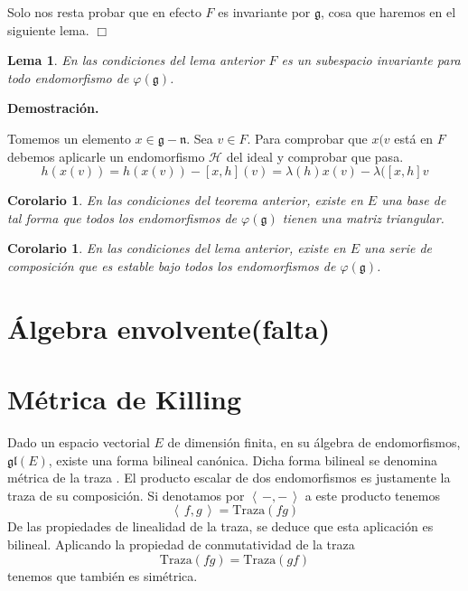 \documentclass[a4paper,draft,12pt]{scrartcl}
\newtheorem{lema}[teo]{Lema}%
\newtheorem{cor}[teo]{Corolario}%
\newcommand{\dem}{\noindent \textbf{Demostración. }\vspace{0.3 cm}}%
\newcommand{\g}{\mathfrak{g}}%
\newcommand{\h}{\mathcal{H}}%
\newcommand{\fin}{ $\Box $ \vspace{0.4 cm}}
\newcommand{\escalar}[2]{\left\langle\, #1,#2\, \right\rangle}  %
\newcommand{\df}[1]{\textsf{\color{blue}#1}}
\begin{document}
 Solo nos resta probar que en efecto $F$ es invariante por $\g$, cosa que haremos en el siguiente lema.  \fin
 
 \begin{lema}
 
En las condiciones del lema anterior $F$ es un subespacio invariante para todo endomorfismo de $\varphi (\g)$.

\end{lema}


\dem

Tomemos un elemento $x \in \g - \mathfrak{n}$.  Sea $v \in F$.  Para comprobar que $x(v$ está en $F$ debemos aplicarle un endomorfismo $\h$ del ideal y comprobar que pasa.
$$
h(x(v))= h(x(v))-[x,h](v)= \lambda(h)x(v)- \lambda([x,h]v
$$














\begin{cor}

En las condiciones del teorema anterior, existe en $E$ una base de tal forma que todos los endomorfismos  de $\varphi(\g)$ tienen una matriz triangular.

\end{cor}

\begin{cor}

En las condiciones del lema anterior, existe en $E$ una serie de composición que  es estable bajo todos los endomorfismos de $\varphi(\g)$.

\end{cor}











\newpage

\section{Álgebra envolvente(falta)}


\newpage

\section{Métrica de Killing}

Dado un espacio vectorial $E$ de dimensión finita, en  su álgebra de endomorfismos, $\mathfrak{gl}(E)$, existe una forma bilineal canónica.  Dicha forma bilineal se denomina  \df{métrica de la traza} .  El producto escalar de dos endomorfismos es justamente la traza de su composición.  Si denotamos por $\escalar{-}{-}$ a este producto tenemos
$$
\escalar{f}{g}= \mathrm{Traza}(fg)
$$
De las propiedades de linealidad de la traza, se deduce  que esta aplicación es bilineal.  Aplicando la propiedad de conmutatividad de la traza
$$
\mathrm{Traza}(fg) = \mathrm{Traza}(gf)
$$
tenemos que también es simétrica.
\end{document}
